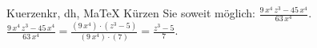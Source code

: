 \begin{MAufgabe}{Kuerzen}{kr, dh, MaTeX}
K\"urzen Sie soweit m\"oglich: $\frac{9\, x^4\, z^3 - 45\, x^4}{63\, x^4}$.\\ 
\ifLsg\MLoesung
\quad $\frac{9\, x^4\, z^3 - 45\, x^4}{63\, x^4}=\frac{(9\, x^4)\cdot(z^3 - 5)}{(9\, x^4)\cdot(7)}=\frac{z^3 - 5}{7}$.\else\relax\fi
 \end{MAufgabe}